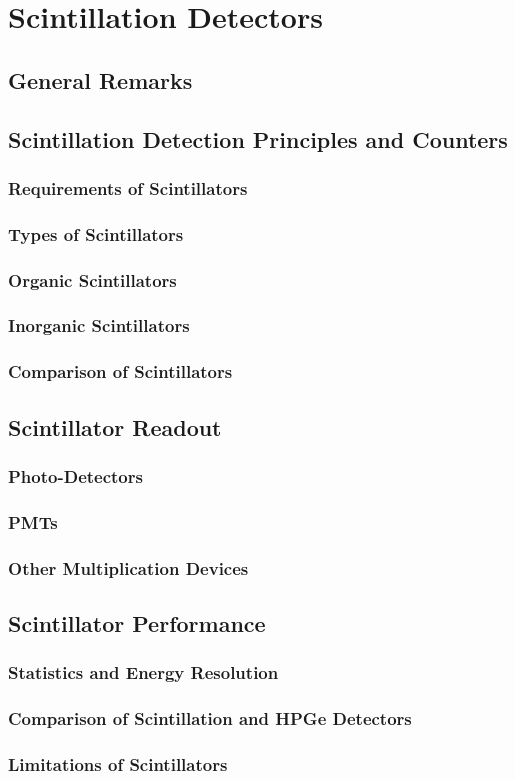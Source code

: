 \section{Scintillation Detectors}
\subsection{General Remarks}

\subsection{Scintillation Detection Principles and Counters}
\subsubsection{Requirements of Scintillators}
\subsubsection{Types of Scintillators}
\subsubsection{Organic Scintillators}
\subsubsection{Inorganic Scintillators}
\subsubsection{Comparison of Scintillators}
\subsection{Scintillator Readout}
\subsubsection{Photo-Detectors}
\subsubsection{PMTs}
\subsubsection{Other Multiplication Devices}
\subsection{Scintillator Performance}
\subsubsection{Statistics and Energy Resolution}
\subsubsection{Comparison of Scintillation and HPGe Detectors}
\subsubsection{Limitations of Scintillators}
